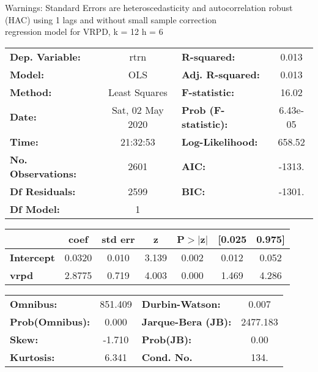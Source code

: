 Warnings: \newline
 [1] Standard Errors are heteroscedasticity and autocorrelation robust (HAC) using 1 lags and without small sample correction\\ 

regression model for VRPD, k = 12 h = 6\begin{center}
\begin{tabular}{lclc}
\toprule
\textbf{Dep. Variable:}    &       rtrn       & \textbf{  R-squared:         } &     0.013   \\
\textbf{Model:}            &       OLS        & \textbf{  Adj. R-squared:    } &     0.013   \\
\textbf{Method:}           &  Least Squares   & \textbf{  F-statistic:       } &     16.02   \\
\textbf{Date:}             & Sat, 02 May 2020 & \textbf{  Prob (F-statistic):} &  6.43e-05   \\
\textbf{Time:}             &     21:32:53     & \textbf{  Log-Likelihood:    } &    658.52   \\
\textbf{No. Observations:} &        2601      & \textbf{  AIC:               } &    -1313.   \\
\textbf{Df Residuals:}     &        2599      & \textbf{  BIC:               } &    -1301.   \\
\textbf{Df Model:}         &           1      & \textbf{                     } &             \\
\bottomrule
\end{tabular}
\begin{tabular}{lcccccc}
                   & \textbf{coef} & \textbf{std err} & \textbf{z} & \textbf{P$> |$z$|$} & \textbf{[0.025} & \textbf{0.975]}  \\
\midrule
\textbf{Intercept} &       0.0320  &        0.010     &     3.139  &         0.002        &        0.012    &        0.052     \\
\textbf{vrpd}      &       2.8775  &        0.719     &     4.003  &         0.000        &        1.469    &        4.286     \\
\bottomrule
\end{tabular}
\begin{tabular}{lclc}
\textbf{Omnibus:}       & 851.409 & \textbf{  Durbin-Watson:     } &    0.007  \\
\textbf{Prob(Omnibus):} &   0.000 & \textbf{  Jarque-Bera (JB):  } & 2477.183  \\
\textbf{Skew:}          &  -1.710 & \textbf{  Prob(JB):          } &     0.00  \\
\textbf{Kurtosis:}      &   6.341 & \textbf{  Cond. No.          } &     134.  \\
\bottomrule
\end{tabular}
\end{center}


